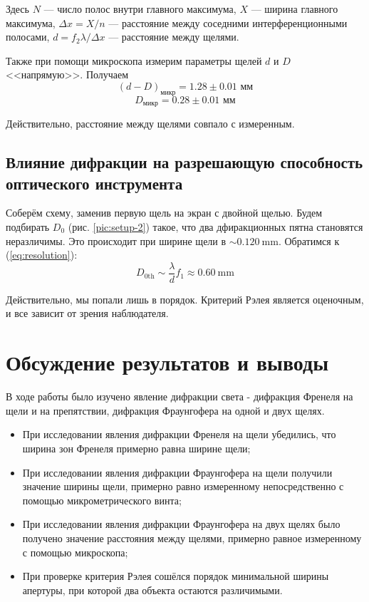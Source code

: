 \documentclass[12pt, a4paper]{article}
\newcommand{\mim}{~\mathrm{mm}}
\begin{document}
Здесь $N$ --- число полос внутри главного максимума, $X$ --- ширина главного максимума, $\Delta x = X/n$ --- расстояние между соседними интерференционными полосами, $d = f_2 \lambda/\Delta x$ --- расстояние между щелями.

Также при помощи микроскопа измерим параметры щелей $ d $ и $ D $ <<напрямую>>. Получаем
\[ (d-D)_\text{микр} = 1.28 \pm 0.01 \text{ мм} \]
\[ D_\text{микр} = 0.28 \pm 0.01 \text{ мм} \]

Действительно, расстояние между щелями совпало с измеренным.

\subsection{Влияние дифракции на разрешающую способность оптического инструмента}
Соберём схему, заменив первую щель на экран с двойной щелью. Будем подбирать $D_0$ (рис. \ref{pic:setup-2}) такое, 
что два дфиракционных пятна становятся неразличимы. Это происходит при ширине щели в $\sim 0.120 \mim$.
Обратимся к (\ref{eq:resolution}):
$$ D_{0\text{th}} \sim \dfrac{\lambda}{d}f_1 \approx 0.60 \mim $$

Действительно, мы попали лишь в порядок. Критерий Рэлея является оценочным, и все зависит от зрения наблюдателя.


\section{Обсуждение результатов и выводы}

В ходе работы было изучено явление дифракции света - дифракция Френеля на щели и на препятствии, дифракция Фраунгофера на одной и двух щелях.

\begin{itemize}
    \item При исследовании явления дифракции Френеля на щели убедились, что ширина зон Френеля примерно равна ширине щели;
    
    \item При исследовании явления дифракции Фраунгофера на щели получили значение ширины щели, примерно равно измеренному непосредственно с помощью микрометрического винта;
    
    \item При исследовании явления дифракции Фраунгофера на двух щелях было получено значение расстояния между щелями, примерно равное измеренному с помощью микроскопа;
    
    \item При проверке критерия Рэлея сошёлся порядок минимальной ширины апертуры, при которой два объекта остаются различимыми.
    
\end{itemize}
\end{document}
